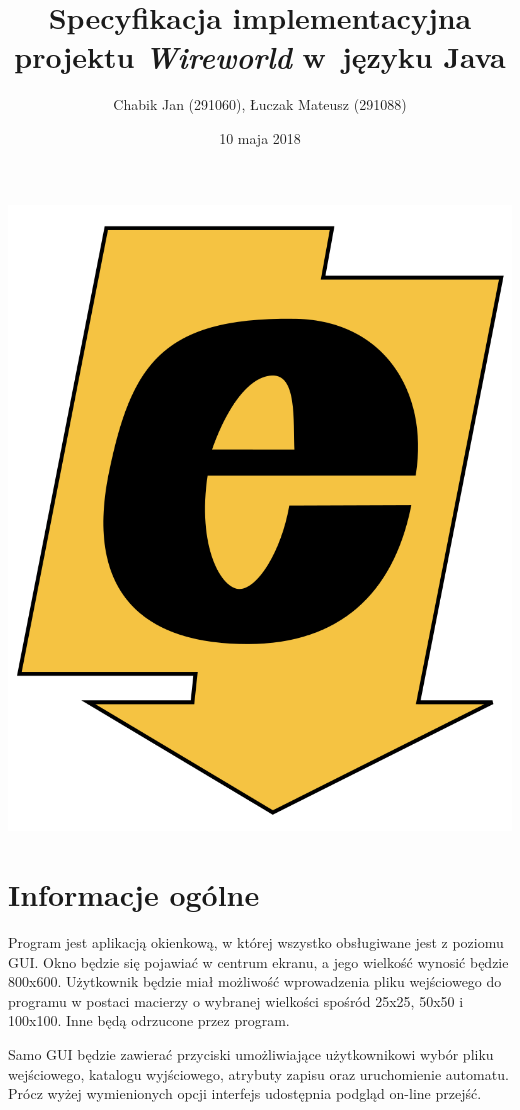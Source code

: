 \documentclass[a4paper,12pt]{article}
\title{Specyfikacja implementacyjna projektu \textit{Wireworld} w~języku Java}
\author{Chabik Jan (291060), Łuczak Mateusz (291088)}
\date{10 maja 2018}
\begin{document}
\maketitle
\thispagestyle{empty}
\begin{center}
	\includegraphics[scale=0.1]{logo_ee_big.png}
\end{center}
\newpage

\tableofcontents
{}
\newpage

\section{Informacje ogólne}
Program jest aplikacją okienkową, w której wszystko obsługiwane jest z poziomu GUI. Okno będzie się pojawiać w centrum ekranu, a jego wielkość wynosić będzie 800x600. Użytkownik będzie miał możliwość wprowadzenia pliku wejściowego do programu w postaci macierzy o wybranej wielkości spośród 25x25, 50x50 i 100x100. Inne będą odrzucone przez program.

Samo GUI będzie zawierać przyciski umożliwiające użytkownikowi wybór pliku wejściowego, katalogu wyjściowego, atrybuty zapisu oraz uruchomienie automatu. Prócz wyżej wymienionych opcji interfejs udostępnia podgląd on-line przejść.
\end{document}
